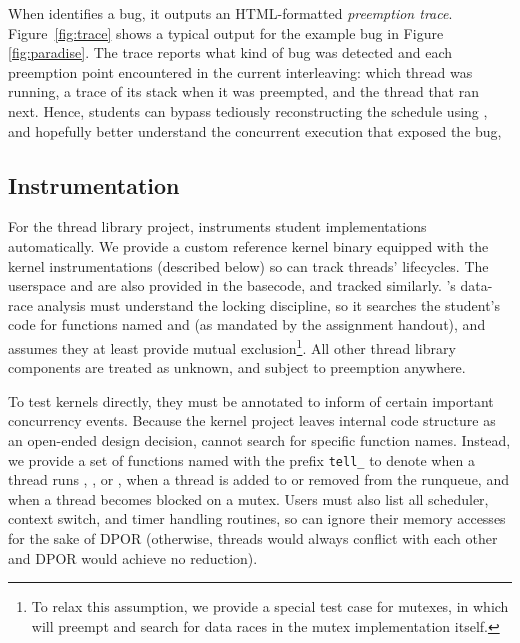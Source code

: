 When \landslide identifies a bug, it outputs an HTML-formatted
{\em preemption trace}.
Figure~\ref{fig:trace} shows a typical output for the example bug in Figure \ref{fig:paradise}.
The trace reports what kind of bug was detected
and each preemption point encountered in the current interleaving:
which thread was running, a trace of its stack when it was preempted, and the thread that ran next.
Hence, students can bypass tediously reconstructing the schedule using ,
and hopefully better understand the concurrent execution that exposed the bug,

\subsection{Instrumentation}

For the thread library project, \landslide instruments student implementations automatically.
We provide a custom reference kernel binary equipped with the kernel instrumentations (described below)
so \landslide can track threads' lifecycles. %
The userspace  and  are also provided in the basecode, and tracked similarly.
\landslide's data-race analysis must understand the locking discipline,
so it searches the student's code for functions named  and  (as mandated by the assignment handout),
and assumes they at least provide mutual exclusion\footnote{
	To relax this assumption, we provide a special test case for mutexes,
	in which \landslide will preempt and search for data races in the mutex implementation itself.
}.
All other thread library components are treated as unknown, and subject to preemption anywhere.

To test \pebbles kernels directly, they must be annotated to inform \landslide of certain important concurrency events.
Because the kernel project leaves internal code structure as an open-ended design decision,
\landslide cannot search for specific function names. %
Instead, we provide a set of functions named with the prefix
\texttt{tell\_\landslide}
to denote when a thread runs , , or , when a thread is added to or removed from the runqueue, and when a thread becomes blocked on a mutex.
Users must also list all scheduler, context switch, and timer handling routines, so \landslide can ignore their memory accesses for the sake of DPOR
(otherwise, threads would always conflict with each other and DPOR would achieve no reduction).

